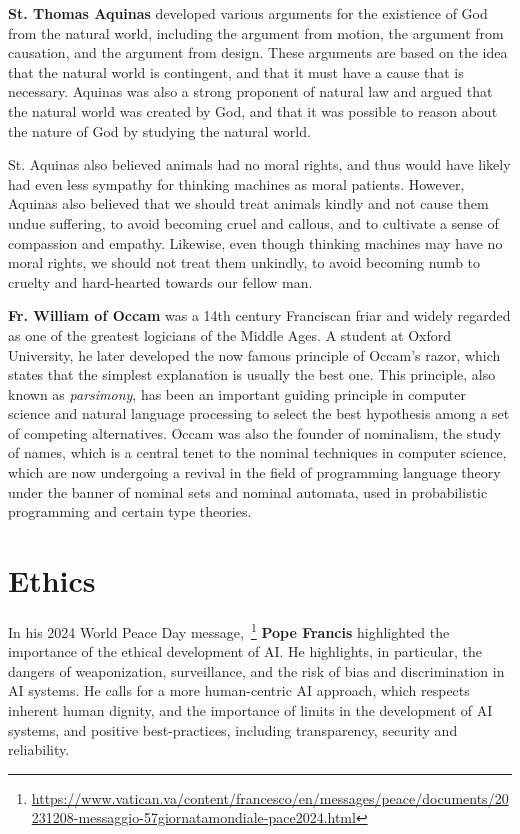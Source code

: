 \documentclass[sigplan,nonacm]{acmart}\settopmatter{printfolios=false,printccs=false,printacmref=false}
\begin{document}
  \textbf{St. Thomas Aquinas} developed various arguments for the existience of God from the natural world, including the argument from motion, the argument from causation, and the argument from design. These arguments are based on the idea that the natural world is contingent, and that it must have a cause that is necessary. Aquinas was also a strong proponent of natural law and argued that the natural world was created by God, and that it was possible to reason about the nature of God by studying the natural world.

  St. Aquinas also believed animals had no moral rights, and thus would have likely had even less sympathy for thinking machines as moral patients. However, Aquinas also believed that we should treat animals kindly and not cause them undue suffering, to avoid becoming cruel and callous, and to cultivate a sense of compassion and empathy. Likewise, even though thinking machines may have no moral rights, we should not treat them unkindly, to avoid becoming numb to cruelty and hard-hearted towards our fellow man.

  \textbf{Fr. William of Occam} was a 14th century Franciscan friar and widely regarded as one of the greatest logicians of the Middle Ages. A student at Oxford University, he later developed the now famous principle of Occam's razor, which states that the simplest explanation is usually the best one. This principle, also known as \textit{parsimony}, has been an important guiding principle in computer science and natural language processing to select the best hypothesis among a set of competing alternatives. Occam was also the founder of nominalism, the study of names, which is a central tenet to the nominal techniques in computer science, which are now undergoing a revival in the field of programming language theory under the banner of nominal sets and nominal automata, used in probabilistic programming and certain type theories.

  \section{Ethics}

  In his 2024 World Peace Day message,~\footnote{\url{https://www.vatican.va/content/francesco/en/messages/peace/documents/20231208-messaggio-57giornatamondiale-pace2024.html}} \textbf{Pope Francis} highlighted the importance of the ethical development of AI. He highlights, in particular, the dangers of weaponization, surveillance, and the risk of bias and discrimination in AI systems. He calls for a more human-centric AI approach, which respects inherent human dignity, and the importance of limits in the development of AI systems, and positive best-practices, including transparency, security and reliability.
\end{document}
